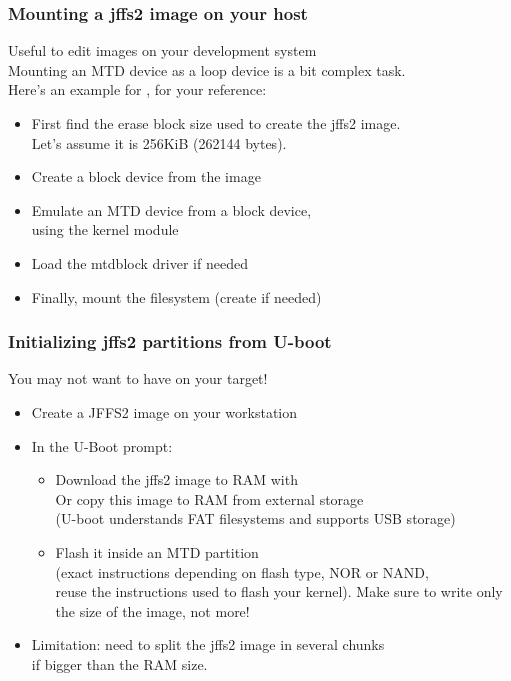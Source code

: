 \begin{frame}
  \frametitle{Mounting a jffs2 image on your host}
  Useful to edit  images on your development system\\
  Mounting an MTD device as a loop device is a bit complex task.\\
  Here's an example for , for your reference:
  \begin{itemize}
  \item First find the erase block size used to create the jffs2 image.\\
    Let's assume it is 256KiB (262144 bytes).
  \item Create a block device from the image\\
  \item Emulate an MTD device from a block device,\\
    using the  kernel module\\
  \item Load the mtdblock driver if needed\\
  \item Finally, mount the filesystem (create  if needed)\\
  \end{itemize}
\end{frame}

\begin{frame}
  \frametitle{Initializing jffs2 partitions from U-boot}
  You may not want to have  on your target!
  \begin{itemize}
  \item Create a JFFS2 image on your workstation
  \item In the U-Boot prompt:
    \begin{itemize}
    \item Download the jffs2 image to RAM with \\
      Or copy this image to RAM from external storage\\
      (U-boot understands FAT filesystems and supports USB storage)
    \item Flash it inside an MTD partition\\
      (exact instructions depending on flash type, NOR or NAND,\\
      reuse the instructions used to flash your kernel). Make sure to
      write only the size of the image, not more!
    \end{itemize}
  \item Limitation: need to split the jffs2 image in several chunks\\
    if bigger than the RAM size.
  \end{itemize}
\end{frame}

